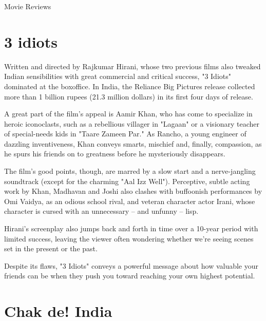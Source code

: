 \documentclass[11pt]{article}
\begin{document}
\begin{center}
\begin{Huge}
Movie Reviews
\end{Huge}
\end{center}
\section*{ 3 idiots }

Written and directed by Rajkumar Hirani, whose two previous films also tweaked Indian sensibilities with great commercial and critical success, "3 Idiots" dominated at the boxoffice. In India, the Reliance Big Pictures release collected more than 1 billion rupees (21.3 million dollars) in its first four days of release.

A great part of the film's appeal is Aamir Khan, who has come to specialize in heroic iconoclasts, such as a rebellious villager in "Lagaan" or a visionary teacher of special-needs kids in "Taare Zameen Par." As Rancho, a young engineer of dazzling inventiveness, Khan conveys smarts, mischief and, finally, compassion, as he spurs his friends on to greatness before he mysteriously disappears.

The film's good points, though, are marred by a slow start and a nerve-jangling soundtrack (except for the charming "Aal Izz Well"). Perceptive, subtle acting work by Khan, Madhavan and Joshi also clashes with buffoonish performances by Omi Vaidya, as an odious school rival, and veteran character actor Irani, whose character is cursed with an unnecessary -- and unfunny -- lisp.


Hirani's screenplay also jumps back and forth in time over a 10-year period with limited success, leaving the viewer often wondering whether we're seeing scenes set in the present or the past.


Despite its flaws, "3 Idiots" conveys a powerful message about how valuable your friends can be when they push you toward reaching your own highest potential.

\section*{ Chak de! India}
\end{document}
